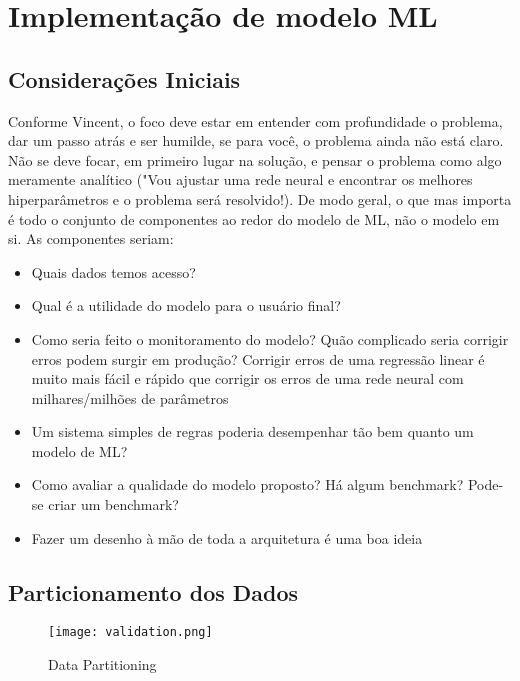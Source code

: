 
\chapter{Implementação de modelo ML} %

\label{ChapterX} %


\section{Considerações Iniciais}

Conforme Vincent, o foco deve estar em entender com profundidade o problema, dar um passo atrás e ser humilde, se para você, o problema ainda não está claro. Não se deve focar, em primeiro lugar na solução, e pensar o problema como algo meramente analítico ("Vou ajustar uma rede neural e encontrar os melhores hiperparâmetros e o problema será resolvido!). De modo geral, o que mas importa é todo o conjunto de componentes ao redor do modelo de ML, não o modelo em si. As componentes seriam:

\begin{itemize}
\item Quais dados temos acesso?
\item Qual é a utilidade do modelo para o usuário final?
\item Como seria feito o monitoramento do modelo? Quão complicado seria corrigir erros podem surgir em produção? Corrigir erros de uma regressão linear é muito mais fácil e rápido que corrigir os erros de uma rede neural com milhares/milhões de parâmetros
\item Um sistema simples de regras poderia desempenhar tão bem quanto um modelo de ML?
\item Como avaliar a qualidade do modelo proposto? Há algum benchmark? Pode-se criar um benchmark?
\item Fazer um desenho à mão de toda a arquitetura é uma boa ideia
\end{itemize}

\section{Particionamento dos Dados}
\begin{figure}[H]
\centering
\caption{Data Partitioning}
\texttt{[image: validation.png]}
\end{figure}


